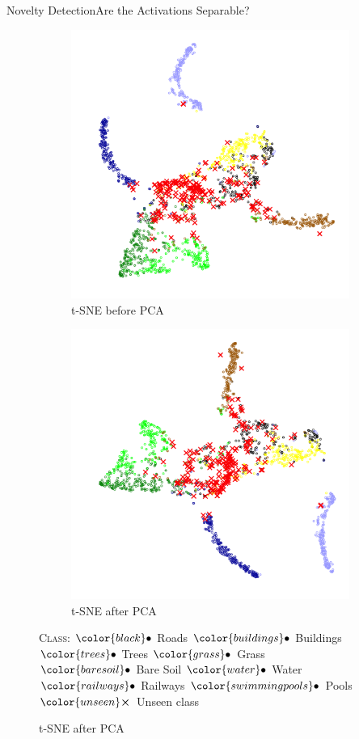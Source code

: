\documentclass[xcolor={usenames,dvipsnames}]{beamer}
\newcommand{\legendBullet}{\footnotesize	
	\textsc{Class}: 
	${\color{black}\bullet}$ Roads
	${\color{buildings}\bullet}$ Buildings
	${\color{trees}\bullet}$ Trees
	${\color{grass}\bullet}$ Grass\\
	${\color{baresoil}\bullet}$ Bare Soil
	${\color{water}\bullet}$ Water
	${\color{railways}\bullet}$ Railways
	${\color{swimmingpools}\bullet}$ Pools\\
	${\color{unseen}\boldsymbol{\times}}$ Unseen class
}
\begin{document}
\begin{frame}{Novelty Detection}{Are the Activations Separable?}
\begin{figure}[H]
	\centering
	\begin{subfigure}{.48\textwidth}
		\centering
		\caption{\gls{t-SNE} before \gls{PCA}}
		\includegraphics[width=\textwidth]{t-SNE_wo_cl2_before_PCA}
	\end{subfigure}
	\begin{subfigure}{.48\textwidth}
		\centering
		\caption{\gls{t-SNE} after \gls{PCA}}
		\includegraphics[width=\textwidth]{t-SNE_wo_cl2_after_PCA}
	\end{subfigure}
	\legendBullet
	\label{fig:tsne-zurich}
\end{figure}
\end{frame}
\end{document}
